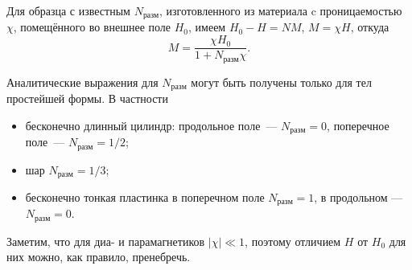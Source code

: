 Для образца с известным $N_{разм}$, изготовленного из материала
c проницаемостью $\chi$, помещённого во внешнее поле $H_0$, имеем
$H_0 - H = N M$, $M=\chi H$, откуда
\[
M = \frac{\chi H_0}{1+N_{разм}\chi}.
\]

Аналитические выражения для $N_{разм}$ могут быть получены только для тел
простейшей формы. В частности
\begin{itemize}
    \item бесконечно длинный цилиндр: продольное поле~--- $N_{разм} = 0$,
          поперечное поле~--- $N_{разм} = 1/2$;
    \item шар $N_{разм} = 1/3$;
    \item бесконечно тонкая пластинка в поперечном поле $N_{разм} = 1$,
          в продольном --- $N_{разм} = 0$.
\end{itemize}

Заметим, что для диа- и парамагнетиков $|\chi|\ll 1$, поэтому отличием $H$ от
$H_0$ для них можно, как правило, пренебречь.

